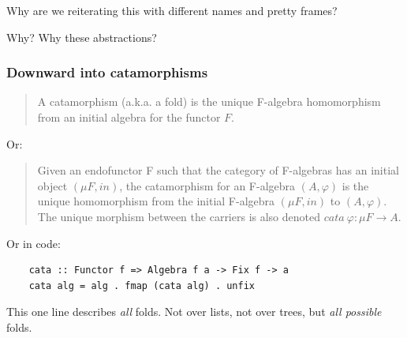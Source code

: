 \documentclass[
  aspectratio=1610, 
  xcolor={dvipsnames},
]{beamer}
\begin{document}


\begin{frame}
  Why are we reiterating this with different names and pretty frames? \pause

  Why? \pause Why these abstractions? 

\end{frame}

\begin{frame}[fragile]
  \frametitle{Downward into catamorphisms}

  \pause
  \begin{quote}
    A catamorphism (a.k.a. a fold) is the unique F-algebra homomorphism from an
    initial algebra for the functor \(F\).
  \end{quote}
    \pause Or:
  \begin{quote}
    Given an endofunctor F such that the category of F-algebras has an initial
    object \((\mu F,in)\), the catamorphism for an F-algebra \((A,\varphi)\) is the unique
    homomorphism from the initial F-algebra \((\mu F,in)\) to \((A,\varphi)\). The unique
    morphism between the carriers is also denoted \(cata~ \varphi: \mu F \to A\).
  \end{quote}

  \pause
  Or in code:
  \begin{lstlisting}
    cata :: Functor f => Algebra f a -> Fix f -> a
    cata alg = alg . fmap (cata alg) . unfix
  \end{lstlisting}

  \pause
  This one line describes \emph{all} folds. Not over lists, not over trees, but
  \emph{all possible} folds.

\end{frame}

\end{document}
